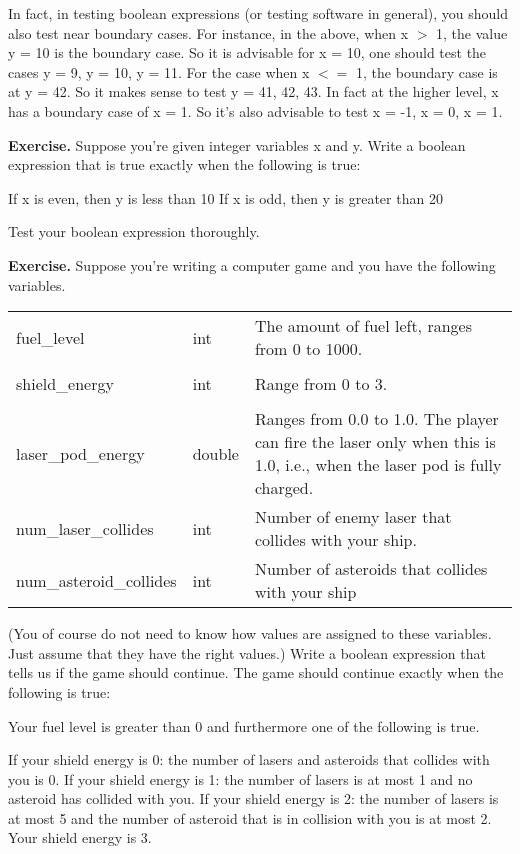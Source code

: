 {{{{{In fact, in testing boolean expressions (or testing software in general),
you should also test near boundary cases. For instance, in the above,
when x $>$ 1, the value y = 10 is the boundary case. So it is advisable for x
= 10, one should test the cases y = 9, y = 10, y = 11. For the case when
x $<=$ 1, the boundary case is at y = 42. So it makes sense to test y = 41,
42, 43. In fact at the higher level, x has a boundary case of x = 1. So it's
also advisable to test x = -1, x = 0, x = 1.


\textbf{Exercise.} Suppose you're given integer variables x and y. Write a
boolean expression that is true exactly when the following is true:
\begin{tightlist}
\li If x is even, then y is less than 10
\li If x is odd, then y is greater than 20
\end{tightlist}
Test your boolean expression thoroughly.

\textbf{Exercise.} Suppose you're writing a computer game and you have the
following variables.

\begin{tabular}{p{4cm} p{2cm} p{5cm}}
  fuel\_level & int & The amount of fuel left, ranges from 0 to 1000.\\

  & &\\ 
  
  shield\_energy & int & Range from 0 to 3.\\

  & &\\ 
  
  laser\_pod\_energy & double & Ranges from 0.0 to 1.0. The player can fire the laser only when this is 1.0, i.e., when the laser pod is fully charged.\\

  num\_laser\_collides & int & Number of enemy laser that collides with your ship.\\

  num\_asteroid\_collides & int & Number of asteroids that collides with your ship\\  
\end{tabular}

(You of course do not need to know how values are assigned to these
variables. Just assume that they have the right values.) Write a boolean
expression that tells us if the game should continue. The game should
continue exactly when the following is true:

Your fuel level is greater than 0 and furthermore one of the following is
true.
\begin{tightlist}
\li If your shield energy is 0: the number of lasers and asteroids that collides with you is 0.
\li If your shield energy is 1: the number of lasers is at most 1 and no asteroid has collided with you.
\li If your shield energy is 2: the number of lasers is at most 5 and the number of asteroid that is in collision with you is at most 2.
\li Your shield energy is 3.
\end{tightlist}

}}}}}
